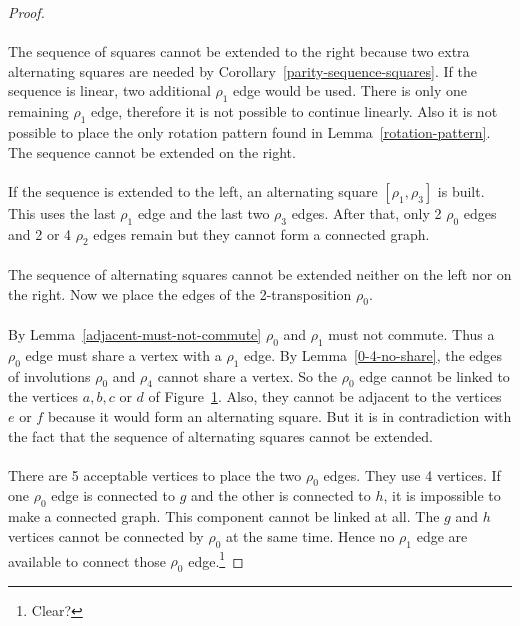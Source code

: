 \begin{proof}
\begin{figure}[H]
\begin{center}
\begin{tikzpicture}[scale=.8]
    \end{tikzpicture}
    \caption{}
    \label{proof-5-3}
  \end{center}
\end{figure}

\paragraph{}
The sequence of squares cannot be extended to the right because two extra alternating squares are needed by Corollary~\ref{parity-sequence-squares}. If the sequence is linear, two additional $\rho_1$ edge would be used. There is only one remaining $\rho_1$ edge, therefore it is not possible to continue linearly. Also it is not possible to place the only rotation pattern found in Lemma~\ref{rotation-pattern}. The sequence cannot be extended on the right.

\paragraph{}
If the sequence is extended to the left, an alternating square $[\rho_1, \rho_3]$ is built. This uses the last $\rho_1$ edge and the last two $\rho_3$ edges. After that, only 2 $\rho_0$ edges and 2 or 4 $\rho_2$ edges remain but they cannot form a connected graph.

\paragraph{}
The sequence of alternating squares cannot be extended neither on the left nor on the right. Now we place the edges of the 2-transposition $\rho_0$.

\paragraph{}
By Lemma~\ref{adjacent-must-not-commute} $\rho_0$ and $\rho_1$ must not commute. Thus a $\rho_0$ edge must share a vertex with a $\rho_1$ edge. By Lemma~\ref{0-4-no-share}, the edges of involutions $\rho_0$ and $\rho_4$ cannot share a vertex. So the $\rho_0$ edge cannot be linked to the vertices $a, b, c$ or $d$ of Figure~\ref{proof-5-3}. Also, they cannot be adjacent to the vertices $e$ or $f$ because it would form an alternating square. But it is in contradiction with the fact that the sequence of alternating squares cannot be extended.

\paragraph{}
There are 5 acceptable vertices to place the two $\rho_0$ edges. They use 4 vertices. If one $\rho_0$ edge is connected to $g$ and the other is connected to $h$, it is impossible to make a connected graph. This component cannot be linked at all. The $g$ and $h$ vertices cannot be connected by $\rho_0$ at the same time. Hence no $\rho_1$ edge are available to connect those $\rho_0$ edge.\footnote{Clear?}


\end{proof}
